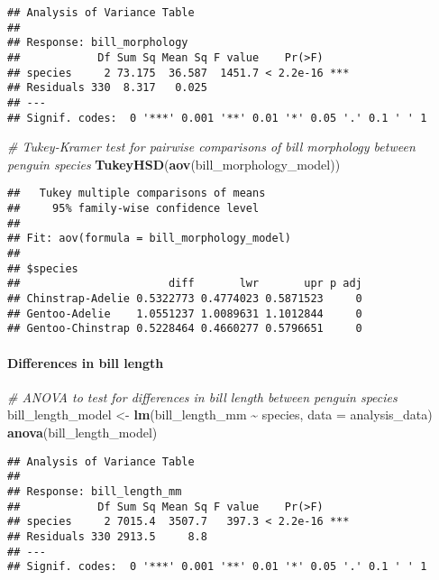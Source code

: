 \documentclass[
]{article}
\newenvironment{Shaded}{\begin{snugshade}}{\end{snugshade}}
\newcommand{\AttributeTok}[1]{\textcolor[rgb]{0.13,0.29,0.53}{#1}}
\newcommand{\CommentTok}[1]{\textcolor[rgb]{0.56,0.35,0.01}{\textit{#1}}}
\newcommand{\FunctionTok}[1]{\textcolor[rgb]{0.13,0.29,0.53}{\textbf{#1}}}
\newcommand{\NormalTok}[1]{#1}
\newcommand{\OtherTok}[1]{\textcolor[rgb]{0.56,0.35,0.01}{#1}}
\newcommand{\SpecialCharTok}[1]{\textcolor[rgb]{0.81,0.36,0.00}{\textbf{#1}}}
\begin{document}
\begin{verbatim}
## Analysis of Variance Table
## 
## Response: bill_morphology
##            Df Sum Sq Mean Sq F value    Pr(>F)    
## species     2 73.175  36.587  1451.7 < 2.2e-16 ***
## Residuals 330  8.317   0.025                      
## ---
## Signif. codes:  0 '***' 0.001 '**' 0.01 '*' 0.05 '.' 0.1 ' ' 1
\end{verbatim}

\begin{Shaded}
\begin{Highlighting}[]
\CommentTok{\# Tukey{-}Kramer test for pairwise comparisons of bill morphology between penguin species}
\FunctionTok{TukeyHSD}\NormalTok{(}\FunctionTok{aov}\NormalTok{(bill\_morphology\_model))}
\end{Highlighting}
\end{Shaded}

\begin{verbatim}
##   Tukey multiple comparisons of means
##     95% family-wise confidence level
## 
## Fit: aov(formula = bill_morphology_model)
## 
## $species
##                       diff       lwr       upr p adj
## Chinstrap-Adelie 0.5322773 0.4774023 0.5871523     0
## Gentoo-Adelie    1.0551237 1.0089631 1.1012844     0
## Gentoo-Chinstrap 0.5228464 0.4660277 0.5796651     0
\end{verbatim}

\paragraph{Differences in bill length}\label{differences-in-bill-length}

\begin{Shaded}
\begin{Highlighting}[]
\CommentTok{\# ANOVA to test for differences in bill length between penguin species}
\NormalTok{bill\_length\_model }\OtherTok{\textless{}{-}} \FunctionTok{lm}\NormalTok{(bill\_length\_mm }\SpecialCharTok{\textasciitilde{}}\NormalTok{ species, }\AttributeTok{data =}\NormalTok{ analysis\_data)}
\FunctionTok{anova}\NormalTok{(bill\_length\_model)}
\end{Highlighting}
\end{Shaded}

\begin{verbatim}
## Analysis of Variance Table
## 
## Response: bill_length_mm
##            Df Sum Sq Mean Sq F value    Pr(>F)    
## species     2 7015.4  3507.7   397.3 < 2.2e-16 ***
## Residuals 330 2913.5     8.8                      
## ---
## Signif. codes:  0 '***' 0.001 '**' 0.01 '*' 0.05 '.' 0.1 ' ' 1
\end{verbatim}
\end{document}
